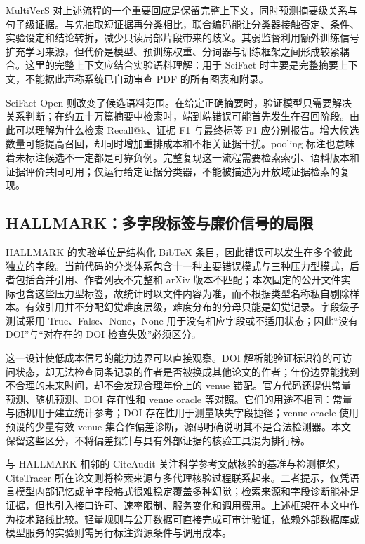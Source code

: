 \documentclass[UTF8,a4paper,11pt]{ctexart}
\begin{document}
MultiVerS 对上述流程的一个重要回应是保留完整上下文，同时预测摘要级关系与句子级证据\cite{multivers}。与先抽取短证据再分类相比，联合编码能让分类器接触否定、条件、实验设定和结论转折，减少只读局部片段带来的歧义。其弱监督利用额外训练信号扩充学习来源，但代价是模型、预训练权重、分词器与训练框架之间形成较紧耦合。这里的完整上下文应结合实验语料理解：用于 SciFact 时主要是完整摘要上下文，不能据此声称系统已自动审查 PDF 的所有图表和附录。

SciFact-Open 则改变了候选语料范围\cite{scifactopen}。在给定正确摘要时，验证模型只需要解决关系判断；在约五十万篇摘要中检索时，端到端错误可能首先发生在召回阶段。由此可以理解为什么检索 Recall@k、证据 F1 与最终标签 F1 应分别报告。增大候选数量可能提高召回，却同时增加重排成本和不相关证据干扰。pooling 标注也意味着未标注候选不一定都是可靠负例。完整复现这一流程需要检索索引、语料版本和证据评价共同可用；仅运行给定证据分类器，不能被描述为开放域证据检索的复现。

\subsection{HALLMARK：多字段标签与廉价信号的局限}

HALLMARK 的实验单位是结构化 BibTeX 条目，因此错误可以发生在多个彼此独立的字段\cite{hallmark}。当前代码的分类体系包含十一种主要错误模式与三种压力型模式，后者包括合并引用、作者列表不完整和 arXiv 版本不匹配；本次固定的公开文件实际也含这些压力型标签，故统计时以文件内容为准，而不根据类型名称私自剔除样本。有效引用并不分配幻觉难度层级，难度分布的分母只能是幻觉记录。字段级子测试采用 True、False、None，None 用于没有相应字段或不适用状态；因此“没有 DOI”与“对存在的 DOI 检查失败”必须区分。

这一设计使低成本信号的能力边界可以直接观察。DOI 解析能验证标识符的可访问状态，却无法检查同条记录的作者是否被换成其他论文的作者；年份边界能找到不合理的未来时间，却不会发现合理年份上的 venue 错配。官方代码还提供常量预测、随机预测、DOI 存在性和 venue oracle 等对照。它们的用途不相同：常量与随机用于建立统计参考；DOI 存在性用于测量缺失字段捷径；venue oracle 使用预设的少量有效 venue 集合作偏差诊断，源码明确说明其不是合法检测器。本文保留这些区分，不将偏差探针与具有外部证据的核验工具混为排行榜。

与 HALLMARK 相邻的 CiteAudit 关注科学参考文献核验的基准与检测框架\cite{citeaudit}，CiteTracer 所在论文则将检索来源与多代理核验过程联系起来\cite{citetracer}。二者提示，仅凭语言模型内部记忆或单字段格式很难稳定覆盖多种幻觉；检索来源和字段诊断能补足证据，但也引入接口许可、速率限制、服务变化和调用费用。上述框架在本文中作为技术路线比较。轻量规则与公开数据可直接完成可审计验证，依赖外部数据库或模型服务的实验则需另行标注资源条件与调用成本。
\end{document}
